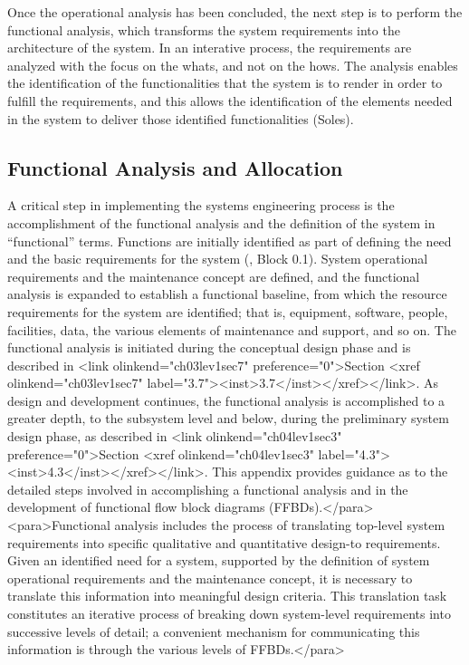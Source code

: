 Once the operational analysis has been concluded, the next step is to perform the functional analysis, which transforms the system requirements into the architecture of the system. In an interative process, the requirements are analyzed with the focus on the whats, and not on the hows. The analysis enables the identification of the functionalities that the system is to render in order to fulfill the requirements, and this allows the identification of the elements needed in the system to deliver those identified functionalities (Soles).

\subsection{Functional Analysis and Allocation}

A critical step in implementing the systems engineering process is the accomplishment of the functional analysis and the definition of the system in “functional” terms. Functions are initially identified as part of defining the need and the basic requirements for the system (, Block 0.1). System operational requirements and the maintenance concept are defined, and the functional analysis is expanded to establish a functional baseline, from which the resource requirements for the system are identified; that is, equipment, software, people, facilities, data, the various elements of maintenance and support, and so on. The functional analysis is initiated during the conceptual design phase and is described in <link olinkend="ch03lev1sec7" preference="0">Section <xref olinkend="ch03lev1sec7" label="3.7"><inst>3.7</inst></xref></link>. As design and development continues, the functional analysis is accomplished to a greater depth, to the subsystem level and below, during the preliminary system design phase, as described in <link olinkend="ch04lev1sec3" preference="0">Section <xref olinkend="ch04lev1sec3" label="4.3"><inst>4.3</inst></xref></link>. This appendix provides guidance as to the detailed steps involved in accomplishing a functional analysis and in the development of functional flow block diagrams (FFBDs).</para>
<para>Functional analysis includes the process of translating top-level system requirements into specific qualitative and quantitative design-to requirements. Given an identified need for a system, supported by the definition of system operational requirements and the maintenance concept, it is necessary to translate this information into meaningful design criteria. This translation task constitutes an iterative process of breaking down system-level requirements into successive levels of detail; a convenient mechanism for communicating this information is through the various levels of FFBDs.</para>

